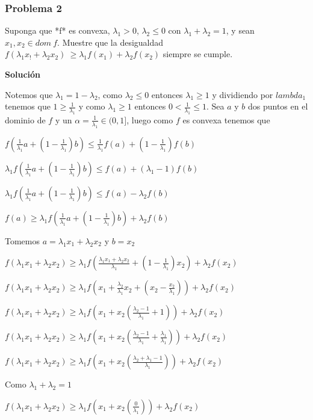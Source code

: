 \documentclass[journal]{IEEEtran}
\begin{document}
\subsubsection{Problema 2}

Suponga que *f* es convexa, $\lambda_1 > 0$, $\lambda_2 \le 0$ con $\lambda_1+\lambda_2 = 1$, y sean $x_1,x_2 \in dom\ f$. Muestre que la desigualdad $f(\lambda_1x_!+\lambda_2x_2) \ \ge \lambda_1f(x_1) + \lambda_2f(x_2)$ siempre se cumple.

\textbf{Solución}

Notemos que $\lambda_1 = 1 - \lambda_2$, como $\lambda_2 \le 0$ entonces $\lambda_1 \ge 1$ y dividiendo por $lambda_1$ tenemos que $1 \ge \frac{1}{\lambda_1}$ y como $\lambda_1 \ge 1$ entonces $0 < \frac{1}{\lambda_1} \le 1$. Sea $a$ y $b$ dos puntos en el dominio de $f$ y un $\alpha = \frac{1}{\lambda_1} \in (0, 1]$, luego como $f$ es convexa tenemos que

$f(\frac{1}{\lambda_1}a + (1- \frac{1}{\lambda_1})b) \le \frac{1}{\lambda_1}f(a) + (1 - \frac{1}{\lambda_1})f(b)$

$\lambda_1 f(\frac{1}{\lambda_1}a + (1- \frac{1}{\lambda_1})b) \le f(a) + (\lambda_1 - 1)f(b)$

$\lambda_1 f(\frac{1}{\lambda_1}a + (1- \frac{1}{\lambda_1})b) \le f(a) - \lambda_2f(b)$

$f(a) \ge \lambda_1 f(\frac{1}{\lambda_1}a + (1- \frac{1}{\lambda_1})b)+ \lambda_2f(b)$

Tomemos $a = \lambda_1x_1 + \lambda_2x_2$ y $b = x_2$

$f(\lambda_1x_1 + \lambda_2x_2) \ge \lambda_1 f(\frac{\lambda_1x_1 + \lambda_2x_2}{\lambda_1} + (1- \frac{1}{\lambda_1})x_2)+ \lambda_2f(x_2)$

$f(\lambda_1x_1 + \lambda_2x_2) \ge \lambda_1 f(x_1 + \frac{\lambda_2}{\lambda_1}x_2 + (x_2 - \frac{x_2}{\lambda_1}))+ \lambda_2f(x_2)$

$f(\lambda_1x_1 + \lambda_2x_2) \ge \lambda_1 f(x_1 + x_2 (\frac{\lambda_2 - 1}{\lambda_1} + 1))+ \lambda_2f(x_2)$

$f(\lambda_1x_1 + \lambda_2x_2) \ge \lambda_1 f(x_1 + x_2 (\frac{\lambda_2 - 1}{\lambda_1} + {\frac{\lambda_1}{\lambda_1}}))+ \lambda_2f(x_2)$

$f(\lambda_1x_1 + \lambda_2x_2) \ge \lambda_1 f(x_1 + x_2 (\frac{\lambda_2 + \lambda_1 - 1}{\lambda_1}))+ \lambda_2f(x_2)$

Como $\lambda_1 + \lambda_2 = 1$

$f(\lambda_1x_1 + \lambda_2x_2) \ge \lambda_1 f(x_1 + x_2 (\frac{0}{\lambda_1}))+ \lambda_2f(x_2)$
\end{document}
